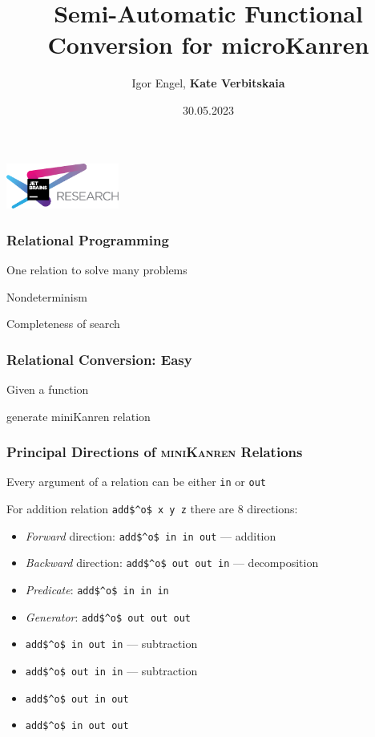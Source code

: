\documentclass[xcolor=table]{beamer}
\title[Functional Conversion for microKanren]{Semi-Automatic Functional Conversion for microKanren}
\institute[JetBrains Research]{
JetBrains Research, Programming Languages and Tools Lab
}
\author[Kate Verbitskaia]{Igor Engel, \textbf{Kate Verbitskaia}}
\date{30.05.2023}
\newcommand{\mk}{\textsc{miniKanren}\xspace}
\begin{document}
{
\begin{frame}[fragile]
   \begin{center}
      \includegraphics[height=1.5cm]{pictures/jetbrainsResearch.pdf}
    \end{center}
  \titlepage
\end{frame}
}


\begin{frame}[fragile]
  \frametitle{Relational Programming}
\begin{center}
One relation to solve many problems
\end{center}

\begin{center}
Nondeterminism
\end{center}

\begin{center}
Completeness of search
\end{center}

\end{frame}

\begin{frame}[fragile]
  \frametitle{Relational Conversion: Easy}
Given a function


generate miniKanren relation

\end{frame}


\begin{frame}[fragile]
  \frametitle{Principal Directions of \mk Relations}
\begin{center}
  Every argument of a relation can be either \lstinline{in} or \lstinline{out}
\end{center}

\begin{center}
  For addition relation \lstinline{add$^o$ x y z} there are 8 directions:
\end{center}

\begin{itemize}
  \item \emph{Forward} direction: \lstinline{add$^o$ in in out} --- addition
  \item \emph{Backward} direction: \lstinline{add$^o$ out out in} --- decomposition
  \item \emph{Predicate}: \lstinline{add$^o$ in in in}
  \item \emph{Generator}: \lstinline{add$^o$ out out out}
  \item \lstinline{add$^o$ in out in} --- subtraction
  \item \lstinline{add$^o$ out in in} --- subtraction
  \item \lstinline{add$^o$ out in out}
  \item \lstinline{add$^o$ in out out}
\end{itemize}
\end{frame}
\end{document}

